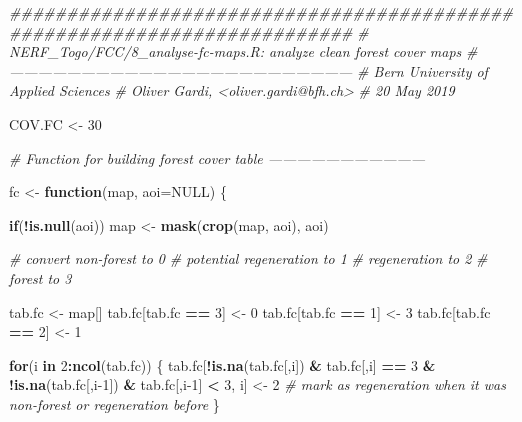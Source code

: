 \documentclass[a4paper, notitlepage, 12pt, krantz2]{krantz}
\newenvironment{Shaded}{\begin{snugshade}}{\end{snugshade}}
\newcommand{\CommentTok}[1]{\textcolor[rgb]{0.56,0.35,0.01}{\textit{#1}}}
\newcommand{\ControlFlowTok}[1]{\textcolor[rgb]{0.13,0.29,0.53}{\textbf{#1}}}
\newcommand{\DataTypeTok}[1]{\textcolor[rgb]{0.13,0.29,0.53}{#1}}
\newcommand{\DecValTok}[1]{\textcolor[rgb]{0.00,0.00,0.81}{#1}}
\newcommand{\KeywordTok}[1]{\textcolor[rgb]{0.13,0.29,0.53}{\textbf{#1}}}
\newcommand{\NormalTok}[1]{#1}
\newcommand{\OperatorTok}[1]{\textcolor[rgb]{0.81,0.36,0.00}{\textbf{#1}}}
\newcommand{\OtherTok}[1]{\textcolor[rgb]{0.56,0.35,0.01}{#1}}
\newcommand{\StringTok}[1]{\textcolor[rgb]{0.31,0.60,0.02}{#1}}
\begin{document}
\begin{Shaded}
\begin{Highlighting}[]
\CommentTok{##########################################################################}
\CommentTok{# NERF_Togo/FCC/8_analyse-fc-maps.R: analyze clean forest cover maps}
\CommentTok{# ------------------------------------------------------------------------}
\CommentTok{# Bern University of Applied Sciences}
\CommentTok{# Oliver Gardi, <oliver.gardi@bfh.ch>}
\CommentTok{# 20 May 2019}

\NormalTok{COV.FC         <-}\StringTok{ }\DecValTok{30}

\CommentTok{# Function for building forest cover table ---------------------------------}

\NormalTok{fc <-}\StringTok{ }\ControlFlowTok{function}\NormalTok{(map, }\DataTypeTok{aoi=}\OtherTok{NULL}\NormalTok{) \{}
  
  \ControlFlowTok{if}\NormalTok{(}\OperatorTok{!}\KeywordTok{is.null}\NormalTok{(aoi)) map <-}\StringTok{ }\KeywordTok{mask}\NormalTok{(}\KeywordTok{crop}\NormalTok{(map, aoi), aoi)}
  
  \CommentTok{# convert non-forest to 0}
  \CommentTok{# potential regeneration to 1}
  \CommentTok{# regeneration to 2}
  \CommentTok{# forest to 3}
  
\NormalTok{  tab.fc <-}\StringTok{ }\NormalTok{map[]}
\NormalTok{  tab.fc[tab.fc }\OperatorTok{==}\StringTok{ }\DecValTok{3}\NormalTok{] <-}\StringTok{ }\DecValTok{0}
\NormalTok{  tab.fc[tab.fc }\OperatorTok{==}\StringTok{ }\DecValTok{1}\NormalTok{] <-}\StringTok{ }\DecValTok{3}
\NormalTok{  tab.fc[tab.fc }\OperatorTok{==}\StringTok{ }\DecValTok{2}\NormalTok{] <-}\StringTok{ }\DecValTok{1}
  
  
  \ControlFlowTok{for}\NormalTok{(i }\ControlFlowTok{in} \DecValTok{2}\OperatorTok{:}\KeywordTok{ncol}\NormalTok{(tab.fc)) \{}
\NormalTok{    tab.fc[}\OperatorTok{!}\KeywordTok{is.na}\NormalTok{(tab.fc[,i]) }\OperatorTok{&}\StringTok{ }\NormalTok{tab.fc[,i] }\OperatorTok{==}\StringTok{ }\DecValTok{3} \OperatorTok{&}\StringTok{ }\OperatorTok{!}\KeywordTok{is.na}\NormalTok{(tab.fc[,i}\DecValTok{-1}\NormalTok{]) }\OperatorTok{&}\StringTok{ }\NormalTok{tab.fc[,i}\DecValTok{-1}\NormalTok{] }\OperatorTok{<}\StringTok{ }\DecValTok{3}\NormalTok{, i] <-}\StringTok{ }\DecValTok{2}  \CommentTok{# mark as regeneration when it was non-forest or regeneration before}
\NormalTok{  \}}
  

\end{Highlighting}
\end{Shaded}
\end{document}
